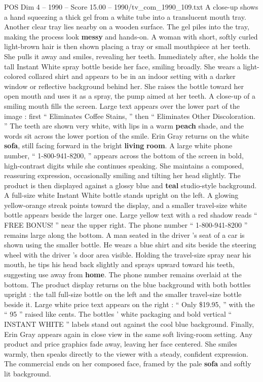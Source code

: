 \begin{textsample}{POS Dim 4 – 1990 – Score 15.00 – 1990/tv\_com\_1990\_109.txt}
A close-up shows a hand squeezing a thick gel from a white tube into a translucent mouth tray.
Another clear tray lies nearby on a wooden surface.
The gel piles into the tray, making the process look \textbf{messy} and hands-on.
A woman with short, softly curled light-brown hair is then shown placing a tray or small mouthpiece at her teeth.
She pulls it away and smiles, revealing her teeth.
Immediately after, she holds the tall Instant White spray bottle beside her face, smiling broadly.
She wears a light-colored collared shirt and appears to be in an indoor setting with a darker window or reflective background behind her.
She raises the bottle toward her open mouth and uses it as a spray, the pump aimed at her teeth.
A close-up of a smiling mouth fills the screen.
Large text appears over the lower part of the image : first “ Eliminates Coffee Stains, ” then “ Eliminates Other Discoloration. ” The teeth are shown very white, with lips in a warm \textbf{peach} shade, and the words sit across the lower portion of the smile.
Erin Gray returns on the white \textbf{sofa}, still facing forward in the bright \textbf{living} \textbf{room}.
A large white phone number, “ 1-800-941-8200, ” appears across the bottom of the screen in bold, high-contrast digits while she continues speaking.
She maintains a composed, reassuring expression, occasionally smiling and tilting her head slightly.
The product is then displayed against a glossy blue and \textbf{teal} studio-style background.
A full-size white Instant White bottle stands upright on the left.
A glowing yellow-orange streak points toward the display, and a smaller travel-size white bottle appears beside the larger one.
Large yellow text with a red shadow reads “ FREE BONUS! ” near the upper right.
The phone number “ 1-800-941-8200 ” remains large along the bottom.
A man seated in the driver ’s seat of a car is shown using the smaller bottle.
He wears a blue shirt and sits beside the steering wheel with the driver ’s door area visible.
Holding the travel-size spray near his mouth, he tips his head back slightly and sprays upward toward his teeth, suggesting use away from \textbf{home}.
The phone number remains overlaid at the bottom.
The product display returns on the blue background with both bottles upright : the tall full-size bottle on the left and the smaller travel-size bottle beside it.
Large white price text appears on the right : “ Only \$19.95, ” with the “ 95 ” raised like cents.
The bottles ’ white packaging and bold vertical “ INSTANT WHITE ” labels stand out against the cool blue background.
Finally, Erin Gray appears again in close view in the same soft living-room setting.
Any product and price graphics fade away, leaving her face centered.
She smiles warmly, then speaks directly to the viewer with a steady, confident expression.
The commercial ends on her composed face, framed by the pale \textbf{sofa} and softly lit background.

\end{textsample}
